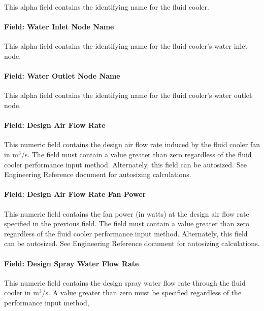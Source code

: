 This alpha field contains the identifying name for the fluid cooler.

\paragraph{Field: Water Inlet Node Name}\label{field-water-inlet-node-name-4}

This alpha field contains the identifying name for the fluid cooler's water inlet node.

\paragraph{Field: Water Outlet Node Name}\label{field-water-outlet-node-name-4}

This alpha field contains the identifying name for the fluid cooler's water outlet node.

\paragraph{Field: Design Air Flow Rate}\label{field-design-air-flow-rate-3}

This numeric field contains the design air flow rate induced by the fluid cooler fan in m\(^{3}\)/s. The field must contain a value greater than zero regardless of the fluid cooler performance input method. Alternately, this field can be autosized. See Engineering Reference document for autosizing calculations.

\paragraph{Field: Design Air Flow Rate Fan Power}\label{field-design-air-flow-rate-fan-power}

This numeric field contains the fan power (in watts) at the design air flow rate specified in the previous field. The field must contain a value greater than zero regardless of the fluid cooler performance input method. Alternately, this field can be autosized. See Engineering Reference document for autosizing calculations.

\paragraph{Field: Design Spray Water Flow Rate}\label{field-design-spray-water-flow-rate}

This numeric field contains the design spray water flow rate through the fluid cooler in m\(^{3}\)/s. A value greater than zero must be specified regardless of the performance input method,

